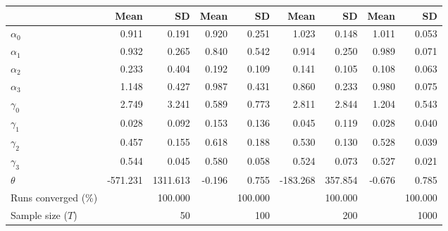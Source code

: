 
\begin{tabular}[t]{lrrrrrrrr}
\toprule
  & Mean & SD & Mean  & SD  & Mean   & SD   & Mean    & SD   \\
\midrule
$\alpha_{0}$ & 0.911 & 0.191 & 0.920 & 0.251 & 1.023 & 0.148 & 1.011 & 0.053\\
$\alpha_{1}$ & 0.932 & 0.265 & 0.840 & 0.542 & 0.914 & 0.250 & 0.989 & 0.071\\
$\alpha_{2}$ & 0.233 & 0.404 & 0.192 & 0.109 & 0.141 & 0.105 & 0.108 & 0.063\\
$\alpha_{3}$ & 1.148 & 0.427 & 0.987 & 0.431 & 0.860 & 0.233 & 0.980 & 0.075\\
$\gamma_{0}$ & 2.749 & 3.241 & 0.589 & 0.773 & 2.811 & 2.844 & 1.204 & 0.543\\
$\gamma_{1}$ & 0.028 & 0.092 & 0.153 & 0.136 & 0.045 & 0.119 & 0.028 & 0.040\\
$\gamma_{2}$ & 0.457 & 0.155 & 0.618 & 0.188 & 0.530 & 0.130 & 0.528 & 0.039\\
$\gamma_{3}$ & 0.544 & 0.045 & 0.580 & 0.058 & 0.524 & 0.073 & 0.527 & 0.021\\
$\theta$ & -571.231 & 1311.613 & -0.196 & 0.755 & -183.268 & 357.854 & -0.676 & 0.785\\
Runs converged (\%) &  & 100.000 &  & 100.000 &  & 100.000 &  & 100.000\\
Sample size ($T$) &  & 50 &  & 100 &  & 200 &  & 1000\\
\bottomrule
\end{tabular}
